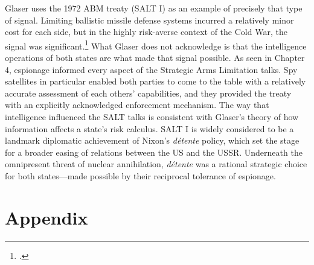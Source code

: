\documentclass{memoir}
\begin{document}
\begin{refsegment}
Glaser uses the 1972 ABM treaty (SALT I) as an example of precisely that type of signal. Limiting ballistic missile defense systems incurred a relatively minor cost for each side, but in the highly risk-averse context of the Cold War, the signal was significant.\footcite[p.~66]{glaser_rational_2010} What Glaser does not acknowledge is that the intelligence operations of both states are what made that signal possible. As seen in Chapter 4, espionage informed every aspect of the Strategic Arms Limitation talks. Spy satellites in particular enabled both parties to come to the table with a relatively accurate assessment of each others' capabilities, and they provided the treaty with an explicitly acknowledged enforcement mechanism. The way that intelligence influenced the SALT talks is consistent with Glaser's theory of how information affects a state's risk calculus. SALT I is widely considered to be a landmark diplomatic achievement of Nixon's \emph{d\'etente} policy, which set the stage for a broader easing of relations between the US and the USSR. Underneath the omnipresent threat of nuclear annihilation, \emph{d\'etente} was a rational strategic choice for both states---made possible by their reciprocal tolerance of espionage.






\section{Appendix}

\end{refsegment}
\end{document}
